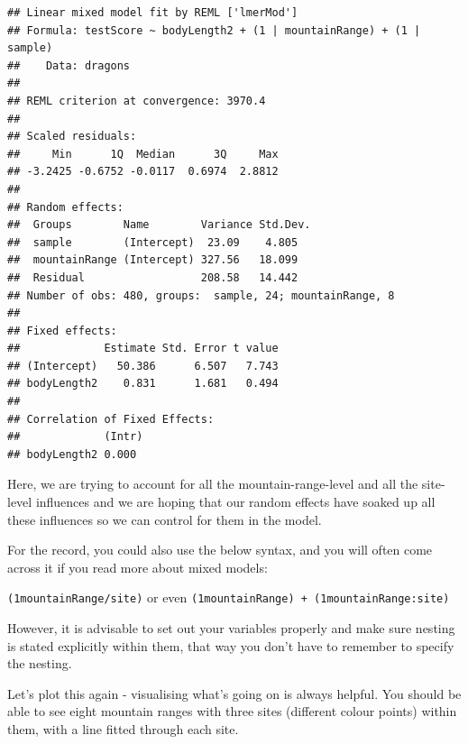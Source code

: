 \documentclass[
]{article}
\begin{document}
\begin{verbatim}
## Linear mixed model fit by REML ['lmerMod']
## Formula: testScore ~ bodyLength2 + (1 | mountainRange) + (1 | sample)
##    Data: dragons
## 
## REML criterion at convergence: 3970.4
## 
## Scaled residuals: 
##     Min      1Q  Median      3Q     Max 
## -3.2425 -0.6752 -0.0117  0.6974  2.8812 
## 
## Random effects:
##  Groups        Name        Variance Std.Dev.
##  sample        (Intercept)  23.09    4.805  
##  mountainRange (Intercept) 327.56   18.099  
##  Residual                  208.58   14.442  
## Number of obs: 480, groups:  sample, 24; mountainRange, 8
## 
## Fixed effects:
##             Estimate Std. Error t value
## (Intercept)   50.386      6.507   7.743
## bodyLength2    0.831      1.681   0.494
## 
## Correlation of Fixed Effects:
##             (Intr)
## bodyLength2 0.000
\end{verbatim}

Here, we are trying to account for all the mountain-range-level and all
the site-level influences and we are hoping that our random effects have
soaked up all these influences so we can control for them in the model.

For the record, you could also use the below syntax, and you will often
come across it if you read more about mixed models:

\texttt{(1\textbar{}mountainRange/site)} or even
\texttt{(1\textbar{}mountainRange)\ +\ (1\textbar{}mountainRange:site)}

However, it is advisable to set out your variables properly and make
sure nesting is stated explicitly within them, that way you don't have
to remember to specify the nesting.

Let's plot this again - visualising what's going on is always helpful.
You should be able to see eight mountain ranges with three sites
(different colour points) within them, with a line fitted through each
site.
\end{document}
